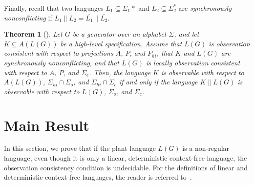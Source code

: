 \documentclass[preprint,1p,times]{elsarticle}
\newtheorem{theorem}{Theorem}
\begin{document}
  Finally, recall that two languages $L_1\subseteq \Sigma_1*$ and $L_2 \subseteq \Sigma_2^*$ are {\em synchronously nonconflicting\/} if $\overline{L_{1}\parallel L_{2}} = \overline{L_{1}} \parallel \overline{L_{2}}$.
  \begin{theorem}[\cite{cdc-ecc2011}]\label{thm3}
    Let $G$ be a generator over an alphabet $\Sigma$, and let $K\subseteq A(L(G))$ be a high-level specification. Assume that $L(G)$ is observation consistent with respect to projections $A$, $P$, and $P_{hi}$, that $K$ and $L(G)$ are synchronously nonconflicting, and that $L(G)$ is locally observation consistent with respect to $A$, $P$, and $\Sigma_{c}$. Then, the language $K$ is observable with respect to $A(L(G))$, $\Sigma_{hi} \cap \Sigma_o$, and $\Sigma_{hi} \cap \Sigma_c$ if and only if the language $K\parallel L(G)$ is observable with respect to $L(G)$, $\Sigma_o$, and $\Sigma_c$.
  \end{theorem}


\section{Main Result}
  In this section, we prove that if the plant language $L(G)$ is a non-regular language, even though it is only a linear, deterministic context-free language, the observation consistency condition is undecidable. For the definitions of linear and deterministic context-free languages, the reader is referred to~\cite{salomaa}.
  
\end{document}

